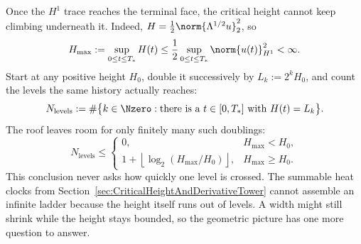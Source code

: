 Once the \(H^1\) trace reaches the terminal face, the critical height cannot keep
climbing underneath it.  Indeed,
\(H=\tfrac12\norm{\Lambda^{1/2}u}_2^2\), so
\begin{equation}\label{eq:BodyCriticalHeightRoof}
  H_{\max}
  :=\sup_{0\leq t\leq T_*}H(t)
  \leq\frac12\sup_{0\leq t\leq T_*}\norm{u(t)}_{H^1}^2
  <\infty.
\end{equation}
Start at any positive height \(H_0\), double it successively by
\(L_k:=2^kH_0\), and count the levels the same history actually reaches:
\[
  N_{\mathrm{levels}}
  :=
  \#\bigl\{k\in\Nzero:\text{there is a }t\in[0,T_*]\text{ with }H(t)=L_k\bigr\}.
\]
The roof leaves room for only finitely many such doublings:
\begin{equation}\label{eq:BodyFiniteZenoOctaveCount}
  N_{\mathrm{levels}}
  \leq
  \begin{cases}
    0,&H_{\max}<H_0,\\
    1+\left\lfloor\log_2(H_{\max}/H_0)\right\rfloor,
      &H_{\max}\geq H_0.
  \end{cases}
\end{equation}
This conclusion never asks how quickly one level is crossed.
The summable heat clocks from Section~\ref{sec:CriticalHeightAndDerivativeTower} cannot
assemble an infinite ladder because the height itself runs out of levels.
A width might still shrink while the height stays bounded, so the geometric
picture has one more question to answer.

